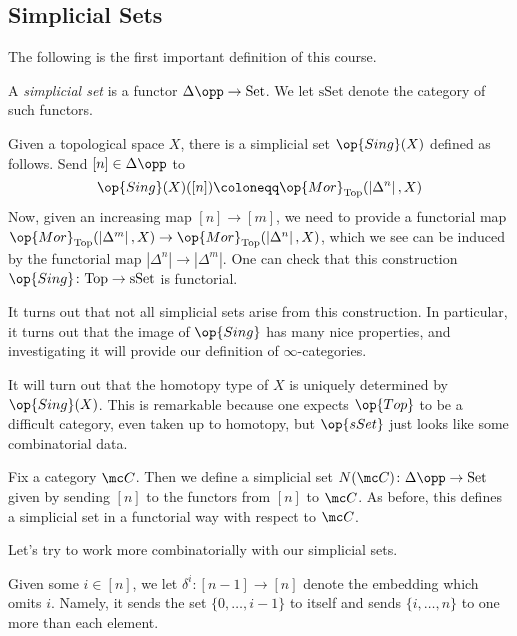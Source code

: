 \documentclass[../notes.tex]{subfiles}
\begin{document}
\subsection{Simplicial Sets}
The following is the first important definition of this course.
\begin{definition}
	A \textit{simplicial set} is a functor $\Delta\opp\to\mathrm{Set}$. We let $\mathrm{sSet}$ denote the category of such functors.
\end{definition}
\begin{example}[$\op{Sing}(X)$]
	Given a topological space $X$, there is a simplicial set $\op{Sing}(X)$ defined as follows. Send $[n]\in\Delta\opp$ to
	\[\op{Sing}(X)([n])\coloneqq\op{Mor}_{\mathrm{Top}}(\left|\Delta^n\right|,X)\]
	Now, given an increasing map $[n]\to[m]$, we need to provide a functorial map $\op{Mor}_{\mathrm{Top}}(\left|\Delta^m\right|,X)\to\op{Mor}_{\mathrm{Top}}(\left|\Delta^n\right|,X)$, which we see can be induced by the functorial map $\left|\Delta^n\right|\to\left|\Delta^m\right|$. One can check that this construction $\op{Sing}\colon\mathrm{Top}\to\mathrm{sSet}$ is functorial.
\end{example}
\begin{remark}
	It turns out that not all simplicial sets arise from this construction. In particular, it turns out that the image of $\op{Sing}$ has many nice properties, and investigating it will provide our definition of $\infty$-categories.
\end{remark}
\begin{remark}
	It will turn out that the homotopy type of $X$ is uniquely determined by $\op{Sing}(X)$. This is remarkable because one expects $\op{Top}$ to be a difficult category, even taken up to homotopy, but $\op{sSet}$ just looks like some combinatorial data.
\end{remark}
\begin{example}[nerve]
	Fix a category $\mc C$. Then we define a simplicial set $N(\mc C)\colon\Delta\opp\to\mathrm{Set}$ given by sending $[n]$ to the functors from $[n]$ to $\mc C$. As before, this defines a simplicial set in a functorial way with respect to $\mc C$.
\end{example}
Let's try to work more combinatorially with our simplicial sets.
\begin{notation}
	Given some $i\in[n]$, we let $\delta^i\colon[n-1]\to[n]$ denote the embedding which omits $i$. Namely, it sends the set $\{0,\ldots,i-1\}$ to itself and sends $\{i,\ldots,n\}$ to one more than each element.
\end{notation}
\end{document}
